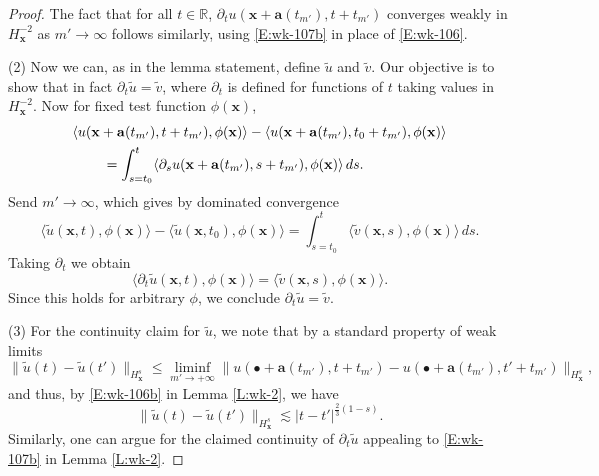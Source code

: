 \documentclass[12pt,letterpaper]{amsart}
\newcommand{\indentalign}{\hspace{0.3in}&\hspace{-0.3in}}
\newcommand{\la}{\langle}
\newcommand{\ra}{\rangle}
\theoremstyle{remark}
\numberwithin{equation}{section}
\numberwithin{theorem}{section}
\numberwithin{table}{section}
\begin{document}
\begin{proof}
The fact that for all $t\in \mathbb{R}$,  $\partial_t u(\mathbf{x}+\mathbf{a}(t_{m'}),t+t_{m'})$ converges weakly in $H_{\mathbf{x}}^{-2}$ as $m'\to\infty$ follows similarly, using \eqref{E:wk-107b} in place of \eqref{E:wk-106}.

(2) Now we can, as in the lemma statement, define $\tilde u$ and $\tilde v$.  Our objective is to show that in fact $\partial_t \tilde u = \tilde v$, where $\partial_t$ is defined for functions of $t$ taking values in $H_{\mathbf{x}}^{-2}$.  Now for fixed test function $\phi(\mathbf{x})$,
\begin{align*}
\indentalign \la u(\mathbf{x}+\mathbf{a}(t_{m'}), t+t_{m'}), \phi(\mathbf{x}) \ra - \la u(\mathbf{x}+\mathbf{a}(t_{m'}),t_0+t_{m'}), \phi(\mathbf{x})\ra \\
&= \int_{s=t_0}^t \la \partial_s u(\mathbf{x}+\mathbf{a}(t_{m'}), s+t_{m'}), \phi(\mathbf{x}) \ra \,ds.
\end{align*}
Send $m'\to \infty$, which gives by dominated convergence
$$
\la \tilde u(\mathbf{x}, t), \phi(\mathbf{x}) \ra - \la \tilde u(\mathbf{x},t_0), \phi(\mathbf{x})\ra = \int_{s=t_0}^t \la \tilde v(\mathbf{x}, s), \phi(\mathbf{x}) \ra \,ds.
$$
Taking $\partial_t$ we obtain
$$
\la \partial_t \tilde u(\mathbf{x}, t), \phi(\mathbf{x}) \ra = \la \tilde v(\mathbf{x}, s), \phi(\mathbf{x}) \ra .
$$
Since this holds for arbitrary $\phi$, we conclude $\partial_t \tilde u = \tilde v$.

(3) For the continuity claim for $\tilde u$, we note that by a standard property of weak limits
$$
\| \tilde u(t) - \tilde u(t') \|_{H_{\mathbf{x}}^s} \leq \liminf_{m'\to+\infty} \| u( \bullet+\mathbf{a}(t_{m'}), t+t_{m'}) - u( \bullet+\mathbf{a}(t_{m'}), t'+t_{m'}) \|_{H_{\mathbf{x}}^s},
$$
and thus, by \eqref{E:wk-106b} in Lemma \ref{L:wk-2}, we have
\begin{equation}
\label{E:wk-108}
\| \tilde u(t) - \tilde u(t') \|_{H_{\mathbf{x}}^s}  \lesssim |t-t'|^{\frac23(1-s)}.
\end{equation}
Similarly, one can argue for the claimed continuity of $\partial_t \tilde u$ appealing to \eqref{E:wk-107b} in Lemma \ref{L:wk-2}.


\end{proof}
\end{document}

